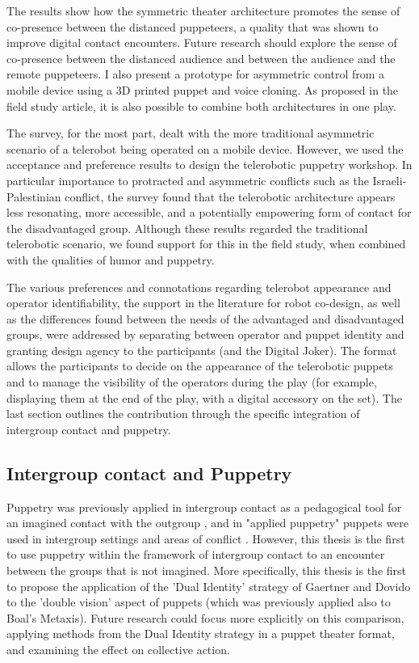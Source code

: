 \documentclass[dissertation,math,vertlayout,pdfa,colorlinks,nologo]{aaltoseries}
\begin{document}
The results show how the symmetric theater architecture promotes the sense of co-presence between the distanced puppeteers, a quality that was shown to improve digital contact encounters. Future research should explore the sense of co-presence between the distanced audience and between the audience and the remote puppeteers. I also present a prototype for asymmetric control from a mobile device using a 3D printed puppet and voice cloning. As proposed in the field study article, it is also possible to combine both architectures in one play.

The survey, for the most part, dealt with the more traditional asymmetric scenario of a telerobot being operated on a mobile device. However, we used the acceptance and preference results to design the telerobotic puppetry workshop. In particular importance to protracted and asymmetric conflicts such as the Israeli-Palestinian conflict, the survey found that the telerobotic architecture appears less resonating, more accessible, and a potentially empowering form of contact for the disadvantaged group. Although these results regarded the traditional telerobotic scenario, we found support for this in the field study, when combined with the qualities of humor and puppetry. 

The various preferences and connotations regarding telerobot appearance and operator identifiability, the support in the literature for robot co-design, as well as the differences found between the needs of the advantaged and disadvantaged groups, were addressed by separating between operator and puppet identity and granting design agency to the participants (and the Digital Joker). The format allows the participants to decide on the appearance of the telerobotic puppets and to manage the visibility of the operators during the play (for example, displaying them at the end of the play, with a digital accessory on the set). The last section outlines the contribution through the specific integration of intergroup contact and puppetry.

\subsection{Intergroup contact and Puppetry}
Puppetry was previously applied in intergroup contact as a pedagogical tool for an imagined contact with the outgroup \cite{charalampidouInventingNewRoad2022}, and in "applied puppetry" puppets were used in intergroup settings and areas of conflict \cite{grantObjectsObjectivesApplied2020}. However, this thesis is the first to use puppetry within the framework of intergroup contact to an encounter between the groups that is not imagined. More specifically, this thesis is the first to propose the application of the 'Dual Identity' strategy of Gaertner and Dovido to the 'double vision' aspect of puppets (which was previously applied also to Boal's Metaxis). Future research could focus more explicitly on this comparison, applying methods from the Dual Identity strategy in a puppet theater format, and examining the effect on collective action.
\end{document}
